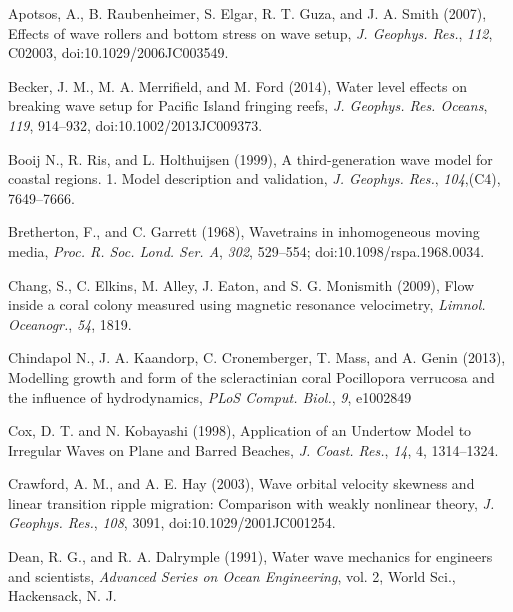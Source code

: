\documentclass[default,jgrga]{agutex2015}
\begin{document}
\begin{article}
\begin{thebibliography}{}

Apotsos, A., B. Raubenheimer, S. Elgar, R. T. Guza, and J. A. Smith (2007), Effects of wave rollers and bottom stress on wave setup, \textit{J. Geophys. Res.}, \textit{112}, C02003, doi:10.1029/2006JC003549.

Becker, J. M., M. A. Merrifield, and M. Ford (2014), Water level effects on breaking wave setup for Pacific Island fringing reefs, \textit{J. Geophys. Res. Oceans}, \textit{119}, 914--932, doi:10.1002/2013JC009373.

Booij N., R. Ris, and L. Holthuijsen (1999), A third-generation wave model for coastal regions. 1. Model description and validation, \textit{J. Geophys. Res.}, \textit{104},(C4), 7649--7666.

Bretherton, F., and C. Garrett (1968), Wavetrains in inhomogeneous moving media, \textit{Proc. R. Soc. Lond. Ser. A}, \textit{302}, 529--554; doi:10.1098/rspa.1968.0034.

Chang, S., C. Elkins, M. Alley, J. Eaton, and S. G. Monismith (2009), Flow inside a coral colony measured using magnetic
resonance velocimetry, \textit{Limnol. Oceanogr.}, \textit{54}, 1819.

Chindapol N., J. A. Kaandorp, C. Cronemberger, T. Mass, and A. Genin (2013), Modelling growth and form of the scleractinian coral Pocillopora verrucosa and the influence of hydrodynamics, \textit{PLoS Comput. Biol.}, \textit{9}, e1002849

Cox, D. T. and N. Kobayashi (1998), Application of an Undertow Model to Irregular Waves on Plane and Barred Beaches, \textit{J. Coast. Res.}, \textit{14}, 4, 1314--1324.

Crawford, A. M., and A. E. Hay (2003), Wave orbital velocity skewness and linear transition ripple migration: Comparison with weakly nonlinear theory, \textit{J. Geophys. Res.}, \textit{108}, 3091, doi:10.1029/2001JC001254.

Dean, R. G., and R. A. Dalrymple (1991), Water wave mechanics for engineers and scientists, \textit{Advanced Series on Ocean Engineering}, vol. 2, World Sci., Hackensack, N. J.


\end{thebibliography}
\end{article}
\end{document}
